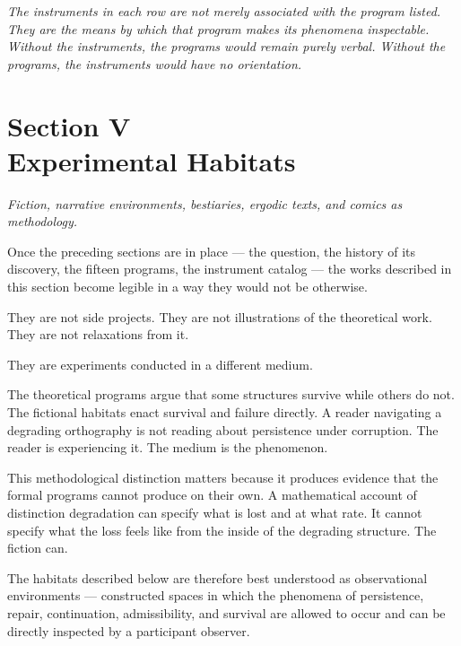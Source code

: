 \documentclass[12pt, openany]{book}
\begin{document}
\bigskip

\noindent\textit{The instruments in each row are not merely associated with
the program listed. They are the means by which that program makes its
phenomena inspectable. Without the instruments, the programs would remain
purely verbal. Without the programs, the instruments would have no
orientation.}

\cleardoublepage

\chapter[Experimental Habitats]{Section V \\ Experimental Habitats}

\noindent\textit{Fiction, narrative environments, bestiaries, ergodic
texts, and comics as methodology.}

\bigskip

\noindent Once the preceding sections are in place — the question, the
history of its discovery, the fifteen programs, the instrument catalog —
the works described in this section become legible in a way they would
not be otherwise.

They are not side projects. They are not illustrations of the theoretical
work. They are not relaxations from it.

They are experiments conducted in a different medium.

The theoretical programs argue that some structures survive while others
do not. The fictional habitats enact survival and failure directly. A
reader navigating a degrading orthography is not reading about persistence
under corruption. The reader is experiencing it. The medium is the
phenomenon.

This methodological distinction matters because it produces evidence that
the formal programs cannot produce on their own. A mathematical account of
distinction degradation can specify what is lost and at what rate. It
cannot specify what the loss feels like from the inside of the degrading
structure. The fiction can.

The habitats described below are therefore best understood as observational
environments — constructed spaces in which the phenomena of persistence,
repair, continuation, admissibility, and survival are allowed to occur and
can be directly inspected by a participant observer.
\end{document}
